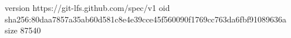 version https://git-lfs.github.com/spec/v1
oid sha256:80daa7857a35ab60d581c8e4e39cce45f560090f1769cc763da6fbf91089636a
size 87540
